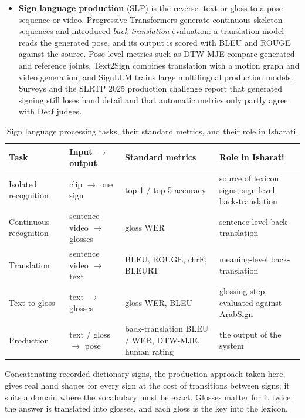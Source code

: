 \begin{itemize}[leftmargin=*,itemsep=2pt]
  \item \textbf{Sign language production} (SLP) is the reverse: text or gloss to a pose sequence or video. Progressive
        Transformers \cite{progressivetransformers} generate continuous skeleton sequences and introduced
        \emph{back-translation} evaluation: a translation model reads the generated pose, and its output is scored with
        BLEU and ROUGE against the source. Pose-level metrics such as DTW-MJE \cite{dtwmje} compare generated and
        reference joints. Text2Sign \cite{text2sign} combines translation with a motion graph and video generation, and
        SignLLM \cite{signllm} trains large multilingual production models. Surveys \cite{slpreview,slpsurvey,slpathways}
        and the SLRTP 2025 production challenge \cite{slrtp2025} report that generated signing still loses hand detail
        and that automatic metrics only partly agree with Deaf judges.
\end{itemize}

\begin{table}[ht]
\centering\small
\caption{Sign language processing tasks, their standard metrics, and their role in Isharati.}
\label{tab:tasks}
\begin{tabularx}{\textwidth}{L{3.0cm} L{2.6cm} L{3.3cm} Y}
\toprule
Task & Input $\rightarrow$ output & Standard metrics & Role in Isharati \\
\midrule
Isolated recognition & clip $\rightarrow$ one sign & top-1 / top-5 accuracy & source of lexicon signs; sign-level back-translation \\
Continuous recognition & sentence video $\rightarrow$ glosses & gloss WER & sentence-level back-translation \\
Translation & sentence video $\rightarrow$ text & BLEU, ROUGE, chrF, BLEURT & meaning-level back-translation \\
Text-to-gloss & text $\rightarrow$ glosses & gloss WER, BLEU & glossing step, evaluated against ArabSign \\
Production & text / gloss $\rightarrow$ pose & back-translation BLEU / WER, DTW-MJE, human rating & the output of the system \\
\bottomrule
\end{tabularx}
\end{table}

Concatenating recorded dictionary signs, the production approach taken here, gives real hand shapes for every sign at
the cost of transitions between signs; it suits a domain where the vocabulary must be exact. Glosses matter for it
twice: the answer is translated into glosses, and each gloss is the key into the lexicon.

